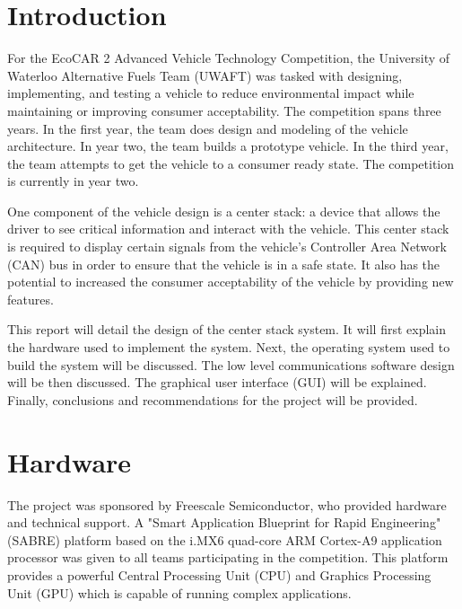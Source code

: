 \documentclass[ece]{uw-wkrpt}
\begin{document}
\mainmatter

\section{Introduction}\label{sec:intro}

For the EcoCAR 2 Advanced Vehicle Technology Competition, the University of
Waterloo Alternative Fuels Team (UWAFT) was tasked with designing, implementing,
and testing a vehicle to reduce environmental impact while maintaining or
improving consumer acceptability. The competition spans three years. In the
first year, the team does design and modeling of the vehicle architecture. In
year two, the team builds a prototype vehicle. In the third year, the team
attempts to get the vehicle to a consumer ready state. The competition is
currently in year two.

One component of the vehicle design is a center stack: a device that allows the
driver to see critical information and interact with the vehicle. This center
stack is required to display certain signals from the vehicle's Controller Area
Network (CAN) bus in order to ensure that the vehicle is in a safe state. It
also has the potential to increased the consumer acceptability of the vehicle
by providing new features.

This report will detail the design of the center stack system. It will first
explain the hardware used to implement the system. Next, the operating system
used to build the system will be discussed. The low level communications
software design will be then discussed. The graphical user interface (GUI) will
be explained. Finally, conclusions and recommendations for the project will be
provided.

\section{Hardware}

The project was sponsored by Freescale Semiconductor, who provided hardware and
technical support. A "Smart Application Blueprint for Rapid Engineering" (SABRE)
platform based on the i.MX6 quad-core ARM Cortex-A9 application processor was
given to all teams participating in the competition. This platform provides a
powerful Central Processing Unit (CPU) and Graphics Processing Unit (GPU) which
is capable of running complex applications.
\end{document}
